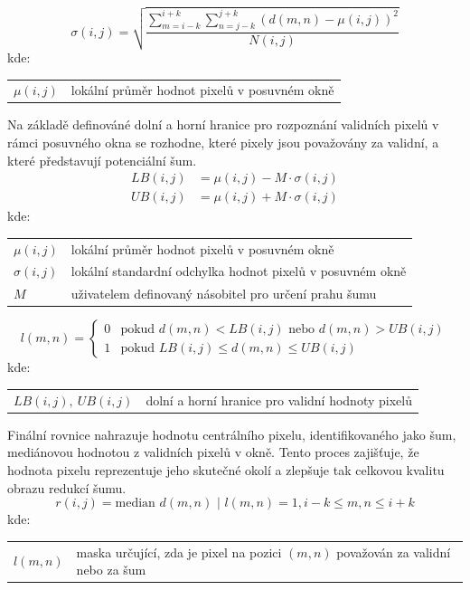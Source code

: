 \documentclass[male,czech,api_ing]{thesis}
\makeatletter
\newenvironment{conditions}[1][kde:]
    {#1 \begin{tabular}[t]{>{$}l<{$} @{${}={}$} >{\raggedright\arraybackslash}p{10cm}}}
    {\end{tabular}}
\makeatother
\begin{document}
\begin{equation}
    \sigma(i, j) = \sqrt{\frac{\sum_{m=i-k}^{i+k} \sum_{n=j-k}^{j+k} (d(m, n) - \mu(i, j))^2}{N(i, j)}}
\end{equation}
\begin{conditions}
    \mu(i, j) & lokální průměr hodnot pixelů v posuvném okně
\end{conditions}

Na základě definováné dolní a horní hranice pro rozpoznání validních pixelů v rámci posuvného okna se rozhodne, které pixely jsou považovány za validní, a které představují potenciální šum.
\begin{equation}
    \begin{split}
        LB(i, j) &= \mu(i, j) - M \cdot \sigma(i, j) \\
        UB(i, j) &= \mu(i, j) + M \cdot \sigma(i, j)
    \end{split}
\end{equation}
\begin{conditions}
    \mu(i, j) & lokální průměr hodnot pixelů v posuvném okně \\
    \sigma(i, j) & lokální standardní odchylka hodnot pixelů v posuvném okně \\
    M & uživatelem definovaný násobitel pro určení prahu šumu
\end{conditions}

\begin{equation}
    l(m, n) = 
    \begin{cases} 
        0 & \text{pokud } d(m, n) < LB(i, j) \text{ nebo } d(m, n) > UB(i, j) \\
        1 & \text{pokud } LB(i, j) \leq d(m, n) \leq UB(i, j)
    \end{cases}
\end{equation}
\begin{conditions}
    LB(i, j), \ UB(i, j) & dolní a horní hranice pro validní hodnoty pixelů
\end{conditions}

Finální rovnice nahrazuje hodnotu centrálního pixelu, identifikovaného jako šum, mediánovou hodnotou z validních pixelů v okně. Tento proces zajišťuje, že hodnota pixelu reprezentuje jeho skutečné okolí a zlepšuje tak celkovou kvalitu obrazu redukcí šumu.
\begin{equation}
    r(i, j) = \text{median } d(m, n) \text{ | } l(m, n) = 1, i-k \le m, n \le i+k
\end{equation}
\begin{conditions}
    l(m, n) & maska určující, zda je pixel na pozici $(m, n)$ považován za validní nebo za šum
\end{conditions}
\end{document}
